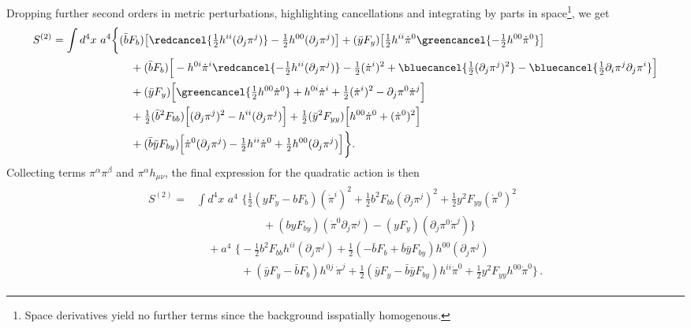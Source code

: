Dropping further second orders in metric perturbations, highlighting cancellations and {\color{blue} integrating by parts in space}\footnote{\label{fn:integrating_parts_space_backround}Space derivatives yield no further terms since the background isspatially homogenous.}, we get
{\small\begin{align}
\begin{aligned}
    S^{(2)}=
    \int d^4x\,\, a^4 \bigg\{&
        (\bar{b}F_b) \big[\redcancel{\tfrac12h^{ii}(\partial_j \pi^j)}-\tfrac12 h^{00}(\partial_j \pi^j)\big]
        + (\bar{y}F_y) \big[\tfrac12 h^{ii} \dot{\pi}^0\greencancel{-\tfrac12 h^{00}\dot{\pi}^0} \big]\\
    &\quad + (\bar{b}F_b) \Big[ - h^{0 i} \dot{\pi}^i \redcancel{-\tfrac12  h^{ii}(\partial_j \pi^j)} - \tfrac12 (\dot{\pi}^i)^2 + \bluecancel{\tfrac12 (\partial_j \pi^j)^2} -\bluecancel{\tfrac12 \partial_i\pi^j\partial_j\pi^i}\Big]
    \\
    &\quad + (\bar{y}F_y) \Big[ \greencancel{\tfrac12 h^{00}\dot{\pi}^0}+ h^{0 i} \dot{\pi}^i + \tfrac12 (\dot{\pi}^i)^2 -\partial_j\pi^0\dot{\pi}^j\Big]
    \\
    &\quad + \tfrac12 (\bar{b}^2 F_{bb})\Big[ (\partial_j \pi^j)^2 - h^{ii}(\partial_j \pi^j)\Big]
    + \tfrac12 (\bar{y}^2 F_{yy})\Big[h^{00} \dot{\pi}^0+ (\dot{\pi}^0)^2\Big]\\
    &\quad+ (\bar{b}\bar{y} F_{by}) \Big[ \dot{\pi}^0(\partial_j \pi^j) - \tfrac12 h^{ii}\dot{\pi}^0 + \tfrac12 h^{00} (\partial_j\pi^j)\Big]
        \bigg\}.
\end{aligned}
\end{align}}
Collecting terms $\pi^\alpha\pi^\beta$ and $\pi^\alpha h_{\mu\nu}$, the final expression for the quadratic action is then
{\small\begin{align}\label{eq:final_quadratic_action_curved_spacetime}
\begin{aligned}
    S^{(2)}=
    &\int d^4x\,\,a^4\,\,\bigg\{
    \tfrac12 (yF_y-bF_b) (\dot{\pi}^i)^2+\tfrac12 b^2 F_{bb} (\partial_j \pi^j)^2
    +\tfrac12 y^2 F_{yy} (\dot{\pi}^0)^2 \\
    &\qquad\qquad\qquad+ (b y F_{by}) (\dot{\pi}^0 \partial_j \pi^j)-(yF_y) (\partial_j \pi^0\dot{\pi}^j)
    \bigg\}\\
    &\quad + a^4\,\,\bigg\{
     -\tfrac12 b^2 F_{bb} h^{ii}(\partial_j \pi^j)
    + \tfrac12\!\left(-\bar{b}F_b + \bar{b}\bar{y}F_{by}\right) h^{00}(\partial_j \pi^j)\\
    &\qquad\qquad+ \left(\bar{y}F_y - \bar{b}F_b\right) h^{0j}\,\dot{\pi}^j + \tfrac12\!\left(\bar{y}F_y - \bar{b}\bar{y}F_{by}\right) h^{ii}\dot{\pi}^0
    + \tfrac12 y^2 F_{yy} h^{00}\dot{\pi}^0
    \bigg\}\,.
\end{aligned}
\end{align}}
